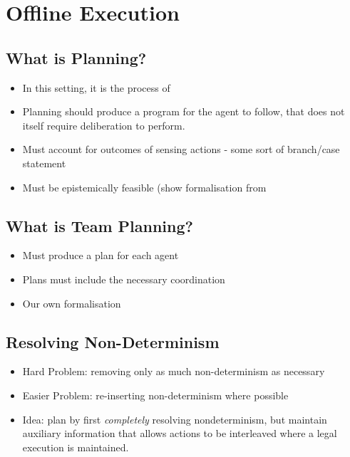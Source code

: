 \chapter{Offline Execution}\label{ch:offline-exec}

\section{What is Planning?}
\begin{itemize}
\item In this setting, it is the process of 
\item Planning should produce a program for the agent to follow, that does
not itself require deliberation to perform. \cite{levesque96what_is_planning,giacomo04sem_delib_indigolog}
\item Must account for outcomes of sensing actions - some sort of branch/case statement
\item Must be epistemically feasible (show formalisation from \cite{giacomo04sem_delib_indigolog}
\end{itemize}

\section{What is Team Planning?}
\begin{itemize}
\item Must produce a plan for each agent
\item Plans must include the necessary coordination
\item Our own formalisation
\end{itemize}

\section{Resolving Non-Determinism}
\begin{itemize}
\item Hard Problem: removing only as much non-determinism as necessary
\item Easier Problem: re-inserting non-determinism where possible
\item Idea:  plan by first \emph{completely} resolving nondeterminism, but
maintain auxiliary information that allows actions to be interleaved where
a legal execution is maintained.
\end{itemize}

